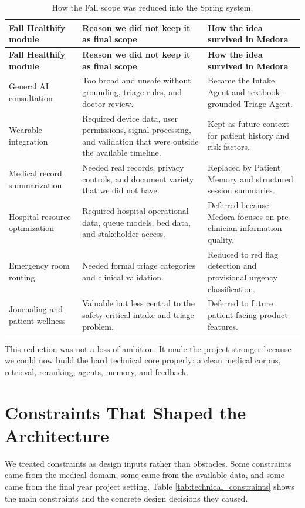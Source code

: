 \begin{longtable}{p{} p{} p{}}
\caption{How the Fall scope was reduced into the Spring system.}
\label{tab:fall_scope_reduction}\\
\toprule
\textbf{Fall Healthify module} & \textbf{Reason we did not keep it as final scope} & \textbf{How the idea survived in Medora}\\
\midrule
\endfirsthead
\toprule
\textbf{Fall Healthify module} & \textbf{Reason we did not keep it as final scope} & \textbf{How the idea survived in Medora}\\
\midrule
\endhead
General AI consultation & Too broad and unsafe without grounding, triage rules, and doctor review. & Became the Intake Agent and textbook-grounded Triage Agent.\\
Wearable integration & Required device data, user permissions, signal processing, and validation that were outside the available timeline. & Kept as future context for patient history and risk factors.\\
Medical record summarization & Needed real records, privacy controls, and document variety that we did not have. & Replaced by Patient Memory and structured session summaries.\\
Hospital resource optimization & Required hospital operational data, queue models, bed data, and stakeholder access. & Deferred because Medora focuses on pre-clinician information quality.\\
Emergency room routing & Needed formal triage categories and clinical validation. & Reduced to red flag detection and provisional urgency classification.\\
Journaling and patient wellness & Valuable but less central to the safety-critical intake and triage problem. & Deferred to future patient-facing product features.\\
\bottomrule
\end{longtable}

This reduction was not a loss of ambition. It made the project stronger because we could now build the hard technical core properly: a clean medical corpus, retrieval, reranking, agents, memory, and feedback.

\section{Constraints That Shaped the Architecture}

We treated constraints as design inputs rather than obstacles. Some constraints came from the medical domain, some came from the available data, and some came from the final year project setting. Table \ref{tab:technical_constraints} shows the main constraints and the concrete design decisions they caused.

